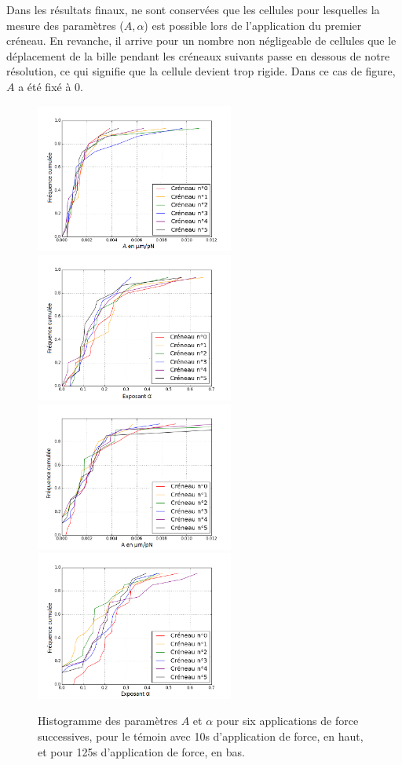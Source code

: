 Dans les résultats finaux, ne sont conservées que les cellules pour lesquelles la mesure des paramètres ($A, \alpha$) est possible lors de l'application du premier créneau. 
En revanche, il arrive pour un nombre non négligeable de cellules que le déplacement de la bille pendant les créneaux suivants passe en dessous de notre résolution, ce qui signifie que la cellule devient trop rigide. Dans ce cas de figure, $A$ a été fixé à 0. 
\begin{center}
\begin{figure}[p]
\includegraphics[width=6.5cm]{Figures/A_creneaux_temoin.png}
\includegraphics[width=6.5cm]{Figures/E_creneaux_temoin.png} 
\\
\includegraphics[width=6.5cm]{Figures/A_creneaux_S2.png} 
\includegraphics[width=6.5cm]{Figures/E_creneaux_S2.png} 
\caption{\label{Evolution_6c} Histogramme des paramètres $A$ et $\alpha$ pour six applications de force successives, pour le témoin avec 10s d’application de force, en haut, et pour 125s d’application de force, en bas.}
\end{figure}
\end{center}
